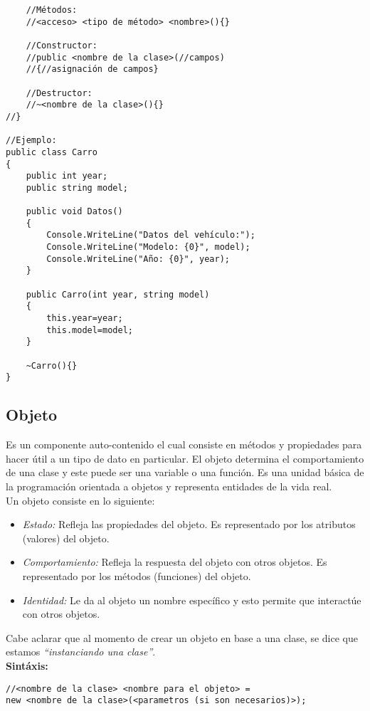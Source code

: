 \documentclass[letterpaper, 12pt]{article}
\begin{document}
\begin{justify}
\begin{verbatim}
    //Métodos:
    //<acceso> <tipo de método> <nombre>(){}

    //Constructor:
    //public <nombre de la clase>(//campos)
    //{//asignación de campos}

    //Destructor:
    //~<nombre de la clase>(){}
//}

//Ejemplo:
public class Carro
{
    public int year;
    public string model;

    public void Datos()
    {
        Console.WriteLine("Datos del vehículo:");
        Console.WriteLine("Modelo: {0}", model);
        Console.WriteLine("Año: {0}", year);
    }

    public Carro(int year, string model)
    {
        this.year=year;
        this.model=model;
    }

    ~Carro(){}
}
            \end{verbatim}
        \subsection{Objeto}
        Es un componente auto-contenido el cual consiste en métodos y propiedades para 
        hacer útil a un tipo de dato en particular. El objeto determina el comportamiento de 
        una clase y este puede ser una variable o una función. Es una unidad básica de la programación 
        orientada a objetos y representa entidades de la vida real. 
        \\
        \newline
        Un objeto consiste en lo siguiente:
        \begin{itemize}
            \item \emph{Estado:} Refleja las propiedades del objeto. Es representado por los atributos (valores) del objeto.
            \item \emph{Comportamiento:} Refleja la respuesta del objeto con otros objetos. Es representado por los métodos (funciones) del objeto.
            \item \emph{Identidad:} Le da al objeto un nombre específico y esto permite que interactúe con otros objetos.
        \end{itemize}
        Cabe aclarar que al momento de crear un objeto en base a una clase, se dice que estamos \emph{“instanciando una clase”}.\newline
        \textbf{\\Sintáxis:}
            \begin{verbatim}
//<nombre de la clase> <nombre para el objeto> = 
new <nombre de la clase>(<parametros (si son necesarios)>);


\end{verbatim}
\end{justify}
\end{document}

